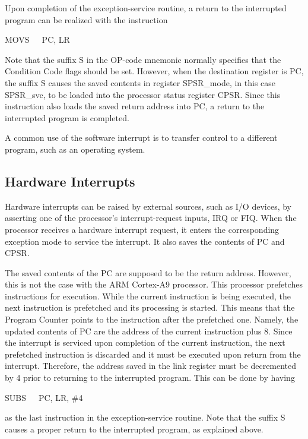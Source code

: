 \documentclass[11pt, twoside, pdftex]{article}
\begin{document}
Upon completion of the exception-service routine, a return to the
interrupted program can be realized with the instruction
\begin{center}
MOVS~~~PC, LR
\end{center}
\noindent
Note that the suffix S in the OP-code mnemonic normally specifies
that the Condition Code flags should be set. However, when the
destination register is PC, the suffix S causes the saved
contents in register SPSR\_mode, in this case SPSR\_svc, to 
be loaded into the processor status register CPSR. Since this
instruction also loads the saved return address into PC, a return
to the interrupted program is completed.

A common use of the software interrupt is to transfer control to
a different program, such as an operating system.

\subsection{Hardware Interrupts}
\label{sec:hardware_interrupts}

Hardware interrupts can be raised by external sources, such as
I/O devices, by asserting one of the processor's
interrupt-request inputs, IRQ or FIQ.
When the processor receives a hardware interrupt request, it
enters the corresponding exception mode to service the interrupt.
It also saves the contents of PC and CPSR. 

The saved contents of the PC are supposed to be the return
address. However, this is not the case with the ARM Cortex-A9
processor. This processor prefetches instructions for execution.
While the current instruction is being executed, the next
instruction is prefetched and its processing is started.
This means that the Program Counter points to the instruction
after the prefetched one. Namely, the updated contents of PC
are the address of the current instruction plus 8.
Since the interrupt is serviced upon completion of the current
instruction, the next prefetched instruction is discarded and
it must be executed upon return from the interrupt. Therefore,
the address saved in the link register must be decremented
by 4 prior to returning to the interrupted program.
This can be done by having
\begin{center}
SUBS~~~PC, LR, \#4
\end{center}
\noindent
as the last instruction in the exception-service routine.
Note that the suffix S causes a proper return to the interrupted
program, as explained above.
\end{document}
